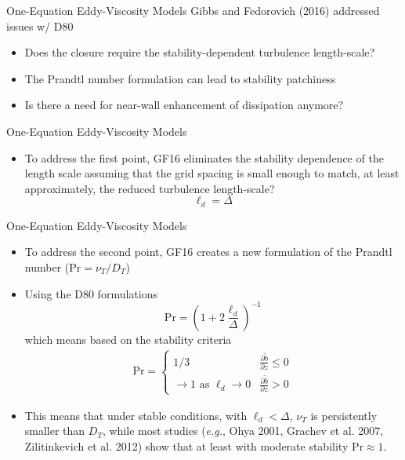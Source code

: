 
\begin{frame}{One-Equation Eddy-Viscosity Models}
Gibbs and Fedorovich (2016) addressed issues w/ D80
\begin{itemize}
	\item Does the closure require the stability-dependent turbulence length-scale?
	\item The Prandtl number formulation can lead to stability patchiness
	\item Is there a need for near-wall enhancement of dissipation anymore?
\end{itemize}

\end{frame}


\begin{frame}{One-Equation Eddy-Viscosity Models}
\begin{itemize}
	\item To address the first point, GF16 eliminates the stability dependence of the length scale assuming that the grid spacing is small enough to match, at least approximately, the reduced turbulence length-scale?
	$$\ell_d = \Delta$$
\end{itemize}

\end{frame}


\begin{frame}{One-Equation Eddy-Viscosity Models}
\begin{itemize}
	\item To address the second point, GF16 creates a new formulation of the Prandtl number ($\text{Pr}=\nu_T/D_T$)
	\item Using the D80 formulations
	$$\text{Pr} = \left(1 + 2\frac{\ell_d}{\Delta}\right)^{{-1}}$$
	which means based on the stability criteria
	\begin{gather*}
\text{Pr} = 
\begin{cases}
1/3 & \frac{\partial \tilde{b}}{\partial z} \leq 0\\
\rightarrow 1 \mbox{ as } \ell_d \rightarrow 0  & \frac{\partial \tilde{b}}{\partial z} > 0
\end{cases}
\end{gather*}
\item This means that under stable conditions, with $\ell_d < \Delta$, $\nu_T$ is persistently smaller than $D_T$, while most studies (\textit{e.g.}, Ohya 2001, Grachev et al. 2007, Zilitinkevich et al. 2012) show that at least with moderate stability Pr$\approx1$.
\end{itemize}

\end{frame}

